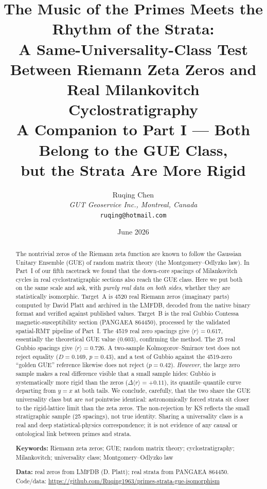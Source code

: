 \documentclass[12pt,a4paper]{article}
\title{\textbf{The Music of the Primes Meets the Rhythm of the Strata:\\
A Same-Universality-Class Test Between Riemann Zeta Zeros and\\
Real Milankovitch Cyclostratigraphy}\\[4pt]
\large A Companion to Part I --- Both Belong to the GUE Class,\\
but the Strata Are More Rigid}
\author{Ruqing Chen\\
\textit{GUT Geoservice Inc., Montreal, Canada}\\
\texttt{ruqing@hotmail.com}}
\date{June 2026}
\begin{document}
\maketitle

\begin{abstract}
The nontrivial zeros of the Riemann zeta function are known to follow the Gaussian Unitary Ensemble (GUE) of random matrix theory (the Montgomery--Odlyzko law). In Part~I of our fifth racetrack \citep{chen2026spatial} we found that the down-core spacings of Milankovitch cycles in real cyclostratigraphic sections also reach the GUE class. Here we put both on the same scale and ask, with \emph{purely real data on both sides}, whether they are statistically isomorphic. Target~A is 4520 real Riemann zeros (imaginary parts) computed by David Platt and archived in the LMFDB, decoded from the native binary format and verified against published values. Target~B is the real Gubbio Contessa magnetic-susceptibility section (PANGAEA 864450), processed by the validated spatial-RMT pipeline of Part~I. The 4519 real zero spacings give $\langle r\rangle = 0.617$, essentially the theoretical GUE value (0.603), confirming the method. The 25 real Gubbio spacings give $\langle r\rangle = 0.726$. A two-sample Kolmogorov--Smirnov test does not reject equality ($D=0.169$, $p=0.43$), and a test of Gubbio against the 4519-zero ``golden GUE'' reference likewise does not reject ($p=0.42$). \emph{However}, the large zero sample makes a real difference visible that a small sample hides: Gubbio is systematically more rigid than the zeros ($\Delta\langle r\rangle = +0.11$), its quantile--quantile curve departing from $y=x$ at both tails. We conclude, carefully, that the two share the GUE universality class but are \emph{not} pointwise identical: astronomically forced strata sit closer to the rigid-lattice limit than the zeta zeros. The non-rejection by KS reflects the small stratigraphic sample (25 spacings), not true identity. Sharing a universality class is a real and deep statistical-physics correspondence; it is not evidence of any causal or ontological link between primes and strata.

\medskip
\noindent\textbf{Keywords:} Riemann zeta zeros; GUE; random matrix theory; cyclostratigraphy; Milankovitch; universality class; Montgomery--Odlyzko law

\medskip
\noindent\textbf{Data:} real zeros from LMFDB (D. Platt); real strata from PANGAEA 864450. Code/data: \url{https://github.com/Ruqing1963/primes-strata-gue-isomorphism}
\end{abstract}
\end{document}
